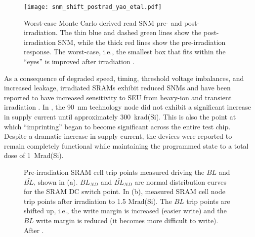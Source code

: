 \begin{figure}[tb]
    \begin{center}
        \texttt{[image: snm\_shift\_postrad\_yao\_etal.pdf]}
    \end{center}
    \caption[Worst-case Monte Carlo derived read SNM pre- and post-irradiation. The thin blue and dashed green lines show the post-irradiation SNM, while the thick red lines show the pre-irradiation response. The worst-case, i.e., the smallest box that fits within the ``eyes'' is improved after irradiation.]{Worst-case Monte Carlo derived read SNM pre- and post-irradiation. The thin blue and dashed green lines show the post-irradiation SNM, while the thick red lines show the pre-irradiation response. The worst-case, i.e., the smallest box that fits within the ``eyes'' is improved after irradiation \cite{Yao:2008ce}.}
    \label{fig:snm_shift_tid_yao}
\end{figure}

As a consequence of degraded speed, timing, threshold voltage imbalances, and increased leakage, irradiated SRAMs exhibit reduced SNMs and have been reported to have increased sensitivity to SEU from heavy-ion and transient irradiation \cite{Fleetwood:1987cfa,Bhuva:1987tq,Brucker:1986fb,Yao:2008ce,Felix:2006jl}.
In \cite{Yao:2008ce}, the 90~nm technology node did not exhibit a significant increase in supply current until approximately 300~krad(Si).
This is also the point at which ``imprinting'' began to become significant across the entire test chip.
Despite a dramatic increase in supply current, the devices were reported to remain completely functional while maintaining the programmed state to a total dose of 1~Mrad(Si).

\begin{figure}[htbp]
    \begin{center}
    \end{center}
    \caption[Pre-irradiation SRAM cell trip points measured driving the $BL$ and $\overline{BL}$, shown in (a). $BL_{ND}$ and $\overline{BL}_{ND}$ are normal distribution curves for the SRAM DC switch point. In (b), measured SRAM cell node trip points after irradiation to 1.5 Mrad(Si). The $BL$ trip points are shifted up, i.e., the write margin is increased (easier write) and the $\overline{BL}$ write margin is reduced (it becomes more difficult to write).]{Pre-irradiation SRAM cell trip points measured driving the $BL$ and $\overline{BL}$, shown in (a). $BL_{ND}$ and $\overline{BL}_{ND}$ are normal distribution curves for the SRAM DC switch point. In (b), measured SRAM cell node trip points after irradiation to 1.5 Mrad(Si). The $BL$ trip points are shifted up, i.e., the write margin is increased (easier write) and the $\overline{BL}$ write margin is reduced (it becomes more difficult to write). After \cite{Yao:2008ce}.}
    \label{fig:sram_swt_pnts_yao}
\end{figure}

